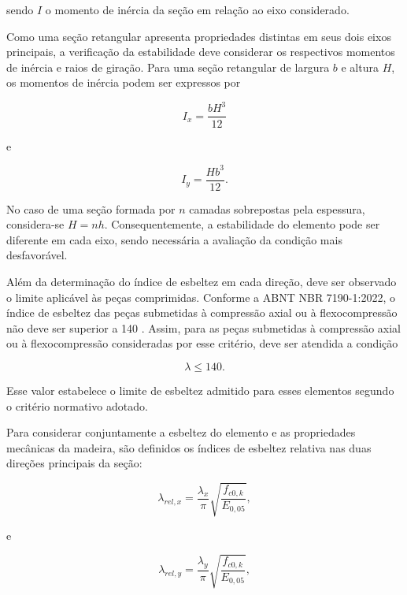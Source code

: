 sendo \(I\) o momento de inércia da seção em relação ao eixo considerado.

Como uma seção retangular apresenta propriedades distintas em seus dois eixos principais, a verificação da estabilidade deve considerar os respectivos momentos de inércia e raios de giração. Para uma seção retangular de largura \(b\) e altura \(H\), os momentos de inércia podem ser expressos por

\begin{equation}
I_x = \frac{bH^3}{12}
\end{equation}

e

\begin{equation}
I_y = \frac{Hb^3}{12}.
\end{equation}

No caso de uma seção formada por \(n\) camadas sobrepostas pela espessura, considera-se \(H = nh\). Consequentemente, a estabilidade do elemento pode ser diferente em cada eixo, sendo necessária a avaliação da condição mais desfavorável.

Além da determinação do índice de esbeltez em cada direção, deve ser observado o limite aplicável às peças comprimidas. Conforme a \gls{ABNT} \gls{NBR} 7190-1:2022, o índice de esbeltez das peças submetidas à compressão axial ou à flexocompressão não deve ser superior a 140 \cite{abnt2022nbr7190}. Assim, para as peças submetidas à compressão axial ou à flexocompressão consideradas por esse critério, deve ser atendida a condição

\begin{equation}
    \lambda \leq 140.
\end{equation}

Esse valor estabelece o limite de esbeltez admitido para esses elementos segundo o critério normativo adotado.

Para considerar conjuntamente a esbeltez do elemento e as propriedades mecânicas da madeira, são definidos os índices de esbeltez relativa nas duas direções principais da seção:

\begin{equation}
    \lambda_{rel,x}
    =
    \frac{\lambda_x}{\pi}
    \sqrt{\frac{f_{c0,k}}{E_{0,05}}},
\end{equation}

e

\begin{equation}
    \lambda_{rel,y}
    =
    \frac{\lambda_y}{\pi}
    \sqrt{\frac{f_{c0,k}}{E_{0,05}}},
\end{equation}

